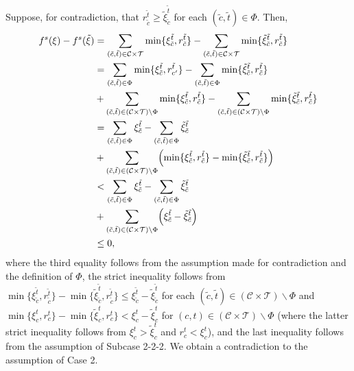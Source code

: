 \documentclass[12pt]{amsart}
\newcommand{\corigin}{c'}
\theoremstyle{remark}
\begin{document}
Suppose, for contradiction, that $r_{\tilde c}^{\tilde t}\geq \tilde \xi_{\tilde c}^{\tilde t}$ for each $(\tilde c, \tilde t)\in \Phi$.
Then,
\begin{align*}
f^s(\xi)-f^s(\tilde \xi)&=\sum_{(\tilde c, \tilde t)\in \mathcal{C}\times \mathcal{T}}\min\{ \xi_{\tilde c}^{\tilde t}, r_{\tilde c}^{\tilde t}\} -\sum_{(\tilde c, \tilde t)\in \mathcal{C}\times \mathcal{T}}\min\{ \tilde \xi_{\tilde c}^{\tilde t}, r_{\tilde c}^{\tilde t}\} \\
&=\sum_{(\tilde c, \tilde t)\in \Phi}\min\{ \xi_{\tilde c}^{\tilde t}, r_{\corigin}^{\tilde t}\} -\sum_{(\tilde c, \tilde t)\in \Phi}\min\{ \tilde \xi_{\tilde c}^{\tilde t}, r_{\tilde c}^{\tilde t}\} \\
&+\sum_{(\tilde c, \tilde t)\in (\mathcal{C}\times \mathcal{T})\backslash \Phi}\min\{ \xi_{\tilde c}^{\tilde t}, r_{\tilde c}^{\tilde t}\} -\sum_{(\tilde c, \tilde t)\in (\mathcal{C}\times \mathcal{T})\backslash \Phi}\min\{ \tilde \xi_{\tilde c}^{\tilde t}, r_{\tilde c}^{\tilde t}\} \\
&=\sum_{(\tilde c, \tilde t)\in \Phi} \xi_{\tilde c}^{\tilde t} -\sum_{(\tilde c, \tilde t)\in \Phi}\tilde \xi_{\tilde c}^{\tilde t} \\
&+\sum_{(\tilde c, \tilde t)\in (\mathcal{C}\times \mathcal{T})\backslash \Phi}\Bigl(\min\{ \xi_{\tilde c}^{\tilde t}, r_{\tilde c}^{\tilde t}\} -\min\{ \tilde \xi_{\tilde c}^{\tilde t}, r_{\tilde c}^{\tilde t}\}\Bigr) \\
&<\sum_{(\tilde c, \tilde t)\in \Phi} \xi_{\tilde c}^{\tilde t} -\sum_{(\tilde c, \tilde t)\in \Phi}\tilde \xi_{\tilde c}^{\tilde t} \\
&+\sum_{(\tilde c, \tilde t)\in (\mathcal{C}\times \mathcal{T})\backslash \Phi} \Bigl(\xi_{\tilde c}^{\tilde t}-\tilde \xi_{\tilde c}^{\tilde t}\Bigr)  \\
&\leq 0,
\end{align*}
where the third equality follows from the assumption made for contradiction and the definition of $\Phi$, the strict inequality follows from $\min\{ \xi_{\tilde c}^{\tilde t}, r_{\tilde c}^{\tilde t}\} -\min\{ \tilde \xi_{\tilde c}^{\tilde t}, r_{\tilde c}^{\tilde t}\}\leq \xi_{\tilde c}^{\tilde t}-\tilde \xi_{\tilde c}^{\tilde t}$ for
each $(\tilde c, \tilde t)\in (\mathcal{C}\times \mathcal{T})\backslash \Phi$ and $\min\{ \xi_{c}^{t}, r_{c}^{t}\} -\min\{ \tilde \xi_{c}^{t}, r_{c}^{t}\}<\xi_{c}^{t}-\tilde \xi_{c}^{t}$ for
$(c,t)\in (\mathcal{C}\times \mathcal{T})\backslash \Phi$ (where the latter strict inequality follows from $\xi_c^t>\tilde \xi_c^t$ and $r_c^t<\xi_c^t$), and the last inequality follows from
the assumption of Subcase 2-2-2. We obtain a contradiction to the assumption of Case 2.
\end{document}
